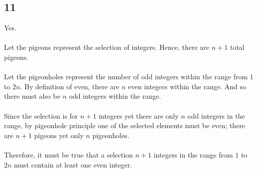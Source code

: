 \documentclass[12pt]{article}
\begin{document}
\subsection*{11}
Yes.
\\ \\
Let the pigeons represent the selection of integers. Hence, there are $n+1$ total pigeons. 
\\ \\
Let the pigeonholes represent the number of odd integers within the range from $1$ to $2n$. By definition of even, there are $n$ even integers within the range. And so there must also be $n$ odd integers within the range.
\\ \\
Since the selection is for $n+1$ integers yet there are only $n$ odd integers in the range, by pigeonhole principle one of the selected elements must be even; there are $n+1$ pigeons yet only $n$ pigeonholes. 
\\ \\ 
Therefore, it must be true that a selection $n+1$ integers in the range from $1$ to $2n$ must contain at least one even integer.

\newpage
\end{document}
